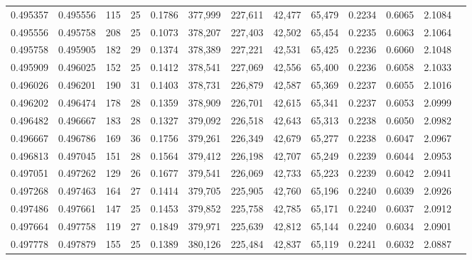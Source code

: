 \begin{tabular}{rrrrrrrrrrrrr}
0.495357 & 0.495556 &    115 &    25 &                                     0.1786 & 377,999 & 227,611 &  42,477 &  65,479 & 0.2234 & 0.6065 & 2.1084 \\
0.495556 & 0.495758 &    208 &    25 &                                     0.1073 & 378,207 & 227,403 &  42,502 &  65,454 & 0.2235 & 0.6063 & 2.1064 \\
0.495758 & 0.495905 &    182 &    29 &                                     0.1374 & 378,389 & 227,221 &  42,531 &  65,425 & 0.2236 & 0.6060 & 2.1048 \\
0.495909 & 0.496025 &    152 &    25 &                                     0.1412 & 378,541 & 227,069 &  42,556 &  65,400 & 0.2236 & 0.6058 & 2.1033 \\
0.496026 & 0.496201 &    190 &    31 &                                     0.1403 & 378,731 & 226,879 &  42,587 &  65,369 & 0.2237 & 0.6055 & 2.1016 \\
0.496202 & 0.496474 &    178 &    28 &                                     0.1359 & 378,909 & 226,701 &  42,615 &  65,341 & 0.2237 & 0.6053 & 2.0999 \\
0.496482 & 0.496667 &    183 &    28 &                                     0.1327 & 379,092 & 226,518 &  42,643 &  65,313 & 0.2238 & 0.6050 & 2.0982 \\
0.496667 & 0.496786 &    169 &    36 &                                     0.1756 & 379,261 & 226,349 &  42,679 &  65,277 & 0.2238 & 0.6047 & 2.0967 \\
0.496813 & 0.497045 &    151 &    28 &                                     0.1564 & 379,412 & 226,198 &  42,707 &  65,249 & 0.2239 & 0.6044 & 2.0953 \\
0.497051 & 0.497262 &    129 &    26 &                                     0.1677 & 379,541 & 226,069 &  42,733 &  65,223 & 0.2239 & 0.6042 & 2.0941 \\
0.497268 & 0.497463 &    164 &    27 &                                     0.1414 & 379,705 & 225,905 &  42,760 &  65,196 & 0.2240 & 0.6039 & 2.0926 \\
0.497486 & 0.497661 &    147 &    25 &                                     0.1453 & 379,852 & 225,758 &  42,785 &  65,171 & 0.2240 & 0.6037 & 2.0912 \\
0.497664 & 0.497758 &    119 &    27 &                                     0.1849 & 379,971 & 225,639 &  42,812 &  65,144 & 0.2240 & 0.6034 & 2.0901 \\
0.497778 & 0.497879 &    155 &    25 &                                     0.1389 & 380,126 & 225,484 &  42,837 &  65,119 & 0.2241 & 0.6032 & 2.0887 \\

\end{tabular}
